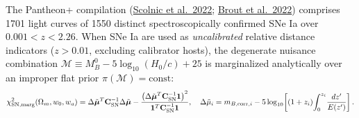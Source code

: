 \documentclass[11pt,letterpaper]{article}
\begin{document}
The Pantheon+ compilation (\href{https://arxiv.org/abs/2112.03863}{Scolnic et al.\ 2022}; \href{https://arxiv.org/abs/2202.04077}{Brout et al.\ 2022}) comprises 1701 light curves of 1550 distinct spectroscopically confirmed SNe Ia over $0.001 < z < 2.26$. When SNe Ia are used as \emph{uncalibrated} relative distance indicators ($z > 0.01$, excluding calibrator hosts), the degenerate nuisance combination $\mathcal{M} \equiv M_B^0 - 5\log_{10}(H_0/c) + 25$ is marginalized analytically over an improper flat prior $\pi(\mathcal{M}) = \text{const}$:
\begin{equation}
    \chi^2_{\text{SN,marg}}(\Omega_m, w_0, w_a) = \Delta\tilde{\boldsymbol{\mu}}^T \mathbf{C}_{\rm SN}^{-1} \Delta\tilde{\boldsymbol{\mu}} - \frac{\left(\Delta\tilde{\boldsymbol{\mu}}^T \mathbf{C}_{\rm SN}^{-1} \mathbf{1}\right)^2}{\mathbf{1}^T \mathbf{C}_{\rm SN}^{-1} \mathbf{1}}, \quad \Delta\tilde{\mu}_i = m_{B,\text{corr},i} - 5\log_{10}\!\left[(1+z_i)\!\int_0^{z_i}\!\frac{dz'}{E(z')}\right].
    \label{eq:chi2_sn_marg}
\end{equation}
\end{document}
